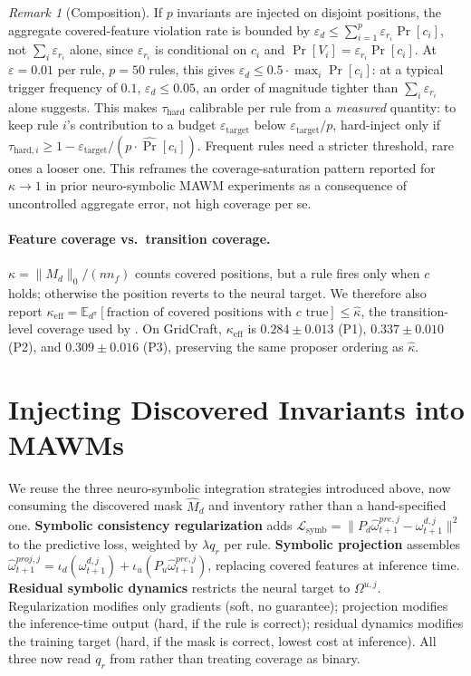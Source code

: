 \documentclass[letterpaper]{article} %
\newcommand{\E}{\mathbb{E}}
\let\autoref\Cref
\theoremstyle{plain}
\theoremstyle{definition}
\theoremstyle{remark}
\newtheorem{remark}[theorem]{Remark}
\begin{document}
\begin{remark}[Composition]
  If $p$ invariants are injected on disjoint positions, the aggregate covered-feature violation rate is bounded by $\varepsilon_d\le\sum_{i=1}^p\varepsilon_{r_i}\Pr[c_i]$, not $\sum_i\varepsilon_{r_i}$ alone, since $\varepsilon_{r_i}$ is conditional on $c_i$ and $\Pr[V_i]=\varepsilon_{r_i}\Pr[c_i]$. At $\varepsilon=0.01$ per rule, $p=50$ rules, this gives $\varepsilon_d\le0.5\cdot\max_i\Pr[c_i]$: at a typical trigger frequency of $0.1$, $\varepsilon_d\le0.05$, an order of magnitude tighter than $\sum_i\varepsilon_{r_i}$ alone suggests. This makes $\tau_{\mathrm{hard}}$ calibrable per rule from a \emph{measured} quantity: to keep rule $i$'s contribution to a budget $\varepsilon_{\mathrm{target}}$ below $\varepsilon_{\mathrm{target}}/p$, hard-inject only if $\tau_{\mathrm{hard},i}\ge1-\varepsilon_{\mathrm{target}}/(p\cdot\widehat{\Pr}[c_i])$. Frequent rules need a stricter threshold, rare ones a looser one. This reframes the coverage-saturation pattern reported for $\kappa\to1$ in prior neuro-symbolic MAWM experiments as a consequence of uncontrolled aggregate error, not high coverage per se.
\end{remark}

\paragraph{Feature coverage vs.\ transition coverage.} $\kappa=\|M_d\|_0/(nn_f)$ counts covered positions, but a rule fires only when $c$ holds; otherwise the position reverts to the neural target. We therefore also report $\kappa_{\mathrm{eff}}=\E_{d^\pi}[\text{fraction of covered positions with }c\text{ true}]\le\hat\kappa$, the transition-level coverage used by \autoref{thm:t3}. On GridCraft, $\kappa_{\mathrm{eff}}$ is $0.284\pm0.013$ (P1), $0.337\pm0.010$ (P2), and $0.309\pm0.016$ (P3), preserving the same proposer ordering as $\hat\kappa$.

\section{Injecting Discovered Invariants into MAWMs}
\label{sec:injection}

We reuse the three neuro-symbolic integration strategies introduced above, now consuming the discovered mask $\hat M_d$ and inventory rather than a hand-specified one. \textbf{Symbolic consistency regularization} adds $\mathcal{L}_{\mathrm{symb}}=\|P_d\hat\omega^{pre,j}_{t+1}-\omega^{d,j}_{t+1}\|^2$ to the predictive loss, weighted by $\lambda q_r$ per rule. \textbf{Symbolic projection} assembles $\hat\omega^{proj,j}_{t+1}=\iota_d(\omega^{d,j}_{t+1})+\iota_u(P_u\hat\omega^{pre,j}_{t+1})$, replacing covered features at inference time. \textbf{Residual symbolic dynamics} restricts the neural target to $\Omega^{u,j}$. Regularization modifies only gradients (soft, no guarantee); projection modifies the inference-time output (hard, if the rule is correct); residual dynamics modifies the training target (hard, if the mask is correct, lowest cost at inference). All three now read $q_r$ from \autoref{alg:main} rather than treating coverage as binary.
\end{document}

